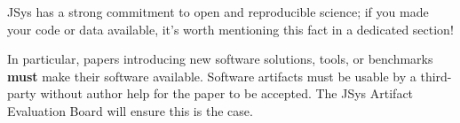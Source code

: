\artifacts

JSys has a strong commitment to open and reproducible science; if you made your
code or data available, it's worth mentioning this fact in a dedicated section!

In particular, papers introducing new software solutions, tools, or benchmarks
\textbf{must} make their software available. Software artifacts must be usable
by a third-party without author help for the paper to be accepted. The JSys
Artifact Evaluation Board will ensure this is the case.






